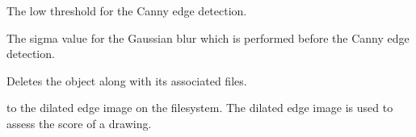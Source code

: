 \documentclass[letterpaper,10pt,english]{sphinxmanual}
\begin{document}
\begin{fulllineitems}
\begin{fulllineitems}
\label{Contour.contour:Contour.contour.models.Image.canny_low_threshold}
The low threshold for the Canny edge detection.

\end{fulllineitems}


\begin{fulllineitems}
\label{Contour.contour:Contour.contour.models.Image.canny_sigma}
The sigma value for the Gaussian blur which is performed before the Canny edge detection.

\end{fulllineitems}


\begin{fulllineitems}
\label{Contour.contour:Contour.contour.models.Image.delete}
Deletes the {\hyperref[Contour.contour:Contour.contour.models.Image]{}} object along with its associated files.

\end{fulllineitems}


\begin{fulllineitems}
\label{Contour.contour:Contour.contour.models.Image.dilated_edge_image}
 to the dilated edge image on the filesystem. The dilated edge image is used to assess the score of a drawing.

\end{fulllineitems}


\begin{fulllineitems}
\label{Contour.contour:Contour.contour.models.Image.drawing_set}
\end{fulllineitems}



\end{fulllineitems}
\end{document}
